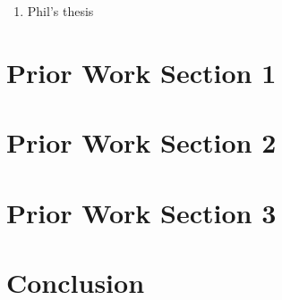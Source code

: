 \begin{enumerate}




\item Phil's thesis
\end{enumerate}



\section{Prior Work Section 1}
\label{sec:priorwork:sec1}


\section{Prior Work Section 2}
\label{sec:priorwork:sec2}


\section{Prior Work Section 3}
\label{sec:priorwork:sec3}


\section{Conclusion}
\label{sec:priorwork:conclusion}

